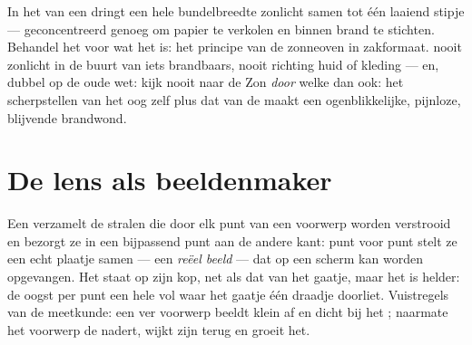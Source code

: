 \begin{remark}\label{rem:g8:lenses-images:burning}
In het  van een  dringt een
hele bundelbreedte zonlicht samen tot één laaiend stipje ---
geconcentreerd genoeg om papier te verkolen en binnen  brand te
stichten. Behandel het voor wat het is: het principe van de zonneoven
in zakformaat.  nooit zonlicht in de buurt van iets brandbaars,
nooit richting huid of kleding --- en, dubbel op de oude wet: kijk nooit
naar de Zon \emph{door} welke  dan ook: het scherpstellen
van het oog zelf plus dat van de  maakt een ogenblikkelijke,
pijnloze, blijvende brandwond.
\end{remark}

\section{De lens als beeldenmaker}

\begin{proposition}\label{prop:g8:lenses-images:realimage}
Een  verzamelt de stralen die door elk punt
van een voorwerp worden verstrooid en bezorgt ze in een bijpassend punt
aan de andere kant: punt voor punt stelt ze een echt plaatje samen ---
een \emph{reëel beeld} --- dat op een scherm kan
worden opgevangen. Het  staat op zijn kop, net als dat van
het gaatje, maar het is helder: de  oogst per punt een
hele  vol  waar het gaatje één draadje doorliet.
Vuistregels van de meetkunde: een ver voorwerp beeldt klein af
en dicht bij het ; naarmate het voorwerp de
 nadert, wijkt zijn  terug en groeit het.
\end{proposition}

